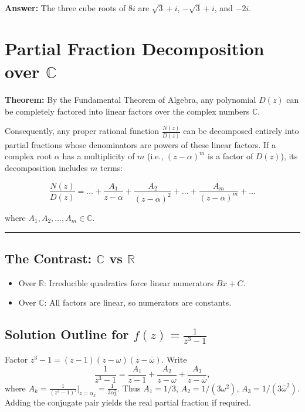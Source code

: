 \documentclass[12pt]{article}
\begin{document}
\textbf{Answer:} The three cube roots of $8i$ are $\sqrt{3} + i$, $-\sqrt{3} + i$, and $-2i$.

\section{Partial Fraction Decomposition over \texorpdfstring{$\mathbb{C}$}{C}}

\textbf{Theorem:} By the Fundamental Theorem of Algebra, any polynomial $D(z)$ can be completely factored into linear factors over the complex numbers $\mathbb{C}$. 

Consequently, any proper rational function $\frac{N(z)}{D(z)}$ can be decomposed entirely into partial fractions whose denominators are powers of these linear factors. If a complex root $\alpha$ has a multiplicity of $m$ (i.e., $(z - \alpha)^m$ is a factor of $D(z)$), its decomposition includes $m$ terms:

\[
\frac{N(z)}{D(z)} = \dots + \frac{A_1}{z - \alpha} + \frac{A_2}{(z - \alpha)^2} + \dots + \frac{A_m}{(z - \alpha)^m} + \dots
\]

where $A_1, A_2, \dots, A_m \in \mathbb{C}$.

\vspace{0.3cm}
\hrule
\vspace{0.3cm}

\subsection{The Contrast: $\mathbb{C}$ vs $\mathbb{R}$}
\begin{itemize}
    \item Over $\mathbb{R}$: Irreducible quadratics force linear numerators $Bx+C$.
    \item Over $\mathbb{C}$: All factors are linear, so numerators are constants.
\end{itemize}

\subsection{Solution Outline for $f(z)=\frac{1}{z^{3}-1}$}
Factor $z^{3}-1=(z-1)(z-\omega)(z-\bar{\omega})$.
Write
\[
\frac{1}{z^{3}-1}= \frac{A_{1}}{z-1}+\frac{A_{2}}{z-\omega}+\frac{A_{3}}{z-\bar{\omega}},
\]
where $A_{k}=\frac{1}{(z^{3}-1)'}\big|_{z=\alpha_{k}} = \frac{1}{3\alpha_{k}^{2}}$. Thus $A_{1}=1/3$, $A_{2}=1/(3\omega^{2})$, $A_{3}=1/(3\bar{\omega}^{2})$. Adding the conjugate pair yields the real partial fraction if required.
\end{document}
